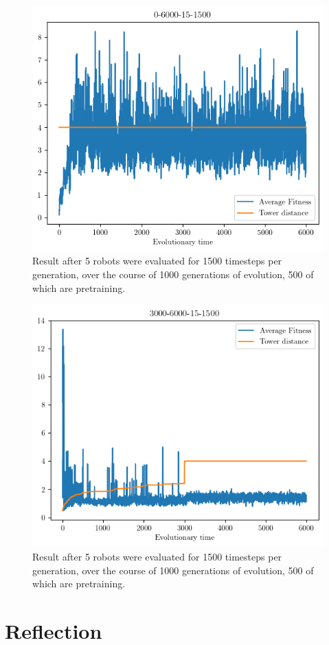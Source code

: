 \documentclass[12pt, a4paper]{article}
\begin{document}
\begin{figure}[h]
	\centering
	\includegraphics[width=1\textwidth]{0-6000-15-1500/0-6000-15-1500.png}
	\caption{Result after 5 robots were evaluated for 1500 timesteps per generation, over the course of 1000 generations of evolution, 500 of which are pretraining.}
	
\end{figure}
\begin{figure}[h]
	\centering
	\includegraphics[width=1\textwidth]{3000-6000-15-1500/3000-6000-15-1500.png}
	\caption{Result after 5 robots were evaluated for 1500 timesteps per generation, over the course of 1000 generations of evolution, 500 of which are pretraining.}
	
\end{figure}

\section{Reflection}
\end{document}
